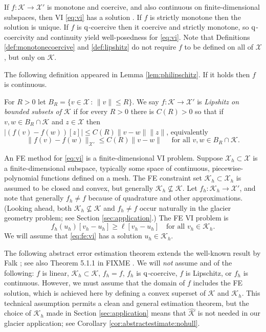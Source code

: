 \documentclass[hidelinks,onefignum,onetabnum,final]{siamart220329}  %
\newcommand{\cK}{\mathcal{K}}
\newcommand{\cX}{\mathcal{X}}
\newcommand{\hcK}{\widehat{\cK}}
\newcommand{\qq}{{\text{\textnormal{q}}}}
\begin{document}
If $f:\cK \to \cX'$ is monotone and coercive, and also continuous on finite-dimensional subspaces, then VI \eqref{eq:vi} has a solution \cite[Corollary III.1.8]{KinderlehrerStampacchia1980}.  If $f$ is strictly monotone then the solution is unique.  If $f$ is $\qq$-coercive then it coercive and strictly monotone, so $\qq$-coercivity and continuity yield well-posedness for \eqref{eq:vi}.  Note that Definitions \ref{def:monotonecoercive} and \ref{def:lipshitz} do not require $f$ to be defined on all of $\cX$, but only on $\cK$.  
  
The following definition appeared in Lemma \ref{lem:philipschitz}.  If it holds then $f$ is continuous.

\begin{definition} \label{def:lipshitz}
For $R>0$ let $B_R = \{v\in \cX\,:\,\|v\|\le R\}$.  We say $f:\cK \to \cX'$ is \emph{Lipshitz on bounded subsets of $\cK$} if for every $R>0$ there is $C(R)>0$ so that if $v,w \in B_R \cap \cK$ and $z\in\cX$ then $|\left(f(v)-f(w)\right)[z]| \le C(R) \|v-w\| \|z\|$, equivalently
\begin{equation}
\|f(v)-f(w)\|_{\cX'} \le C(R) \|v-w\| \quad \text{ for all } v,w \in B_R \cap \cK.  \label{eq:liponbounded}
\end{equation}
\end{definition}

An FE method for \eqref{eq:vi} is a finite-dimensional VI problem.  Suppose $\cX_h \subset \cX$ is a finite-dimensional subspace, typically some space of continuous, piecewise-polynomial functions defined on a mesh.  The FE constraint set $\cK_h\subset \cX_h$ is assumed to be closed and convex, but generally $\cK_h \nsubseteq \cK$.  Let $f_h:\cK_h\to\cX'$, and note that generally $f_h\ne f$ because of quadrature and other approximations.  (Looking ahead, both $\cK_h \nsubseteq \cK$ and $f_h\ne f$ occur naturally in the glacier geometry problem; see Section \ref{sec:application}.)  The FE VI problem is
\begin{equation}
f_h(u_h)[v_h-u_h] \ge \ell[v_h-u_h] \quad \text{for all } v_h\in \cK_h. \label{eq:fe:vi}
\end{equation}
We will assume that \eqref{eq:fe:vi} has a solution $u_h\in\cK_h$.

The following abstract error estimation theorem extends the well-known result by Falk \cite{Falk1974}; see also Theorem 5.1.1 in \cite{Ciarlet2002} FIXME \cite{KirbyShapero2024}.  We will \emph{not} assume and of the following: $f$ is linear, $\cK_h \subset \cK$, $f_h=f$, $f_h$ is $\qq$-coercive, $f$ is Lipschitz, or $f_h$ is continuous.  However, we must assume that the domain of $f$ includes the FE solution, which is achieved here by defining a convex superset of $\cK$ and $\cK_h$.  This technical assumption permits a clean and general estimation theorem, but the choice of $\cK_h$ made in Section \ref{sec:application} means that $\hcK$ is not needed in our glacier application; see Corollary \ref{cor:abstractestimate:nohull}.
\end{document}
